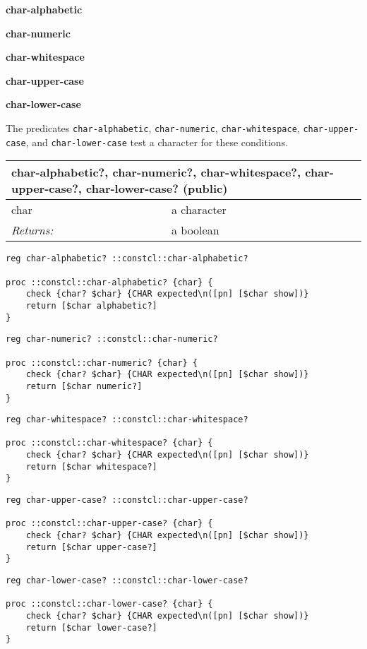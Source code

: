 \documentclass{report}
\begin{document}
\textbf{char-alphabetic}


\textbf{char-numeric}


\textbf{char-whitespace}


\textbf{char-upper-case}


\textbf{char-lower-case}


The predicates \texttt{char-alphabetic}, \texttt{char-numeric}, \texttt{char-whitespace}, \texttt{char-upper-case}, and \texttt{char-lower-case} test a character for these conditions.

\begin{tabular}{ |l l| }
\hline
\multicolumn{2}{|l|}{char-alphabetic?, char-numeric?, char-whitespace?, char-upper-case?, char-lower-case? (public)} \\
\hline
char & a character \\
\textit{Returns:} & a boolean \\
\hline
\end{tabular}

\noindent\makebox[\linewidth]{\rule{\linewidth}{0.4pt}}
\begin{lstlisting}
reg char-alphabetic? ::constcl::char-alphabetic?
 
proc ::constcl::char-alphabetic? {char} {
    check {char? $char} {CHAR expected\n([pn] [$char show])}
    return [$char alphabetic?]
}
\end{lstlisting}
\noindent\makebox[\linewidth]{\rule{\linewidth}{0.4pt}}
\noindent\makebox[\linewidth]{\rule{\linewidth}{0.4pt}}
\begin{lstlisting}
reg char-numeric? ::constcl::char-numeric?
 
proc ::constcl::char-numeric? {char} {
    check {char? $char} {CHAR expected\n([pn] [$char show])}
    return [$char numeric?]
}
\end{lstlisting}
\noindent\makebox[\linewidth]{\rule{\linewidth}{0.4pt}}
\noindent\makebox[\linewidth]{\rule{\linewidth}{0.4pt}}
\begin{lstlisting}
reg char-whitespace? ::constcl::char-whitespace?
 
proc ::constcl::char-whitespace? {char} {
    check {char? $char} {CHAR expected\n([pn] [$char show])}
    return [$char whitespace?]
}
\end{lstlisting}
\noindent\makebox[\linewidth]{\rule{\linewidth}{0.4pt}}
\noindent\makebox[\linewidth]{\rule{\linewidth}{0.4pt}}
\begin{lstlisting}
reg char-upper-case? ::constcl::char-upper-case?
 
proc ::constcl::char-upper-case? {char} {
    check {char? $char} {CHAR expected\n([pn] [$char show])}
    return [$char upper-case?]
}
\end{lstlisting}
\noindent\makebox[\linewidth]{\rule{\linewidth}{0.4pt}}
\noindent\makebox[\linewidth]{\rule{\linewidth}{0.4pt}}
\begin{lstlisting}
reg char-lower-case? ::constcl::char-lower-case?
 
proc ::constcl::char-lower-case? {char} {
    check {char? $char} {CHAR expected\n([pn] [$char show])}
    return [$char lower-case?]
}
\end{lstlisting}
\noindent\makebox[\linewidth]{\rule{\linewidth}{0.4pt}}
\end{document}
